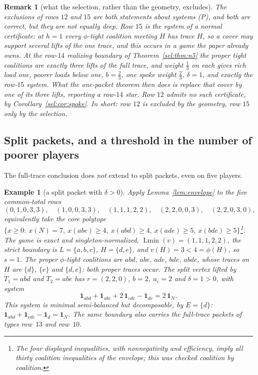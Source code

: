 \documentclass[11pt]{article}
\newtheorem{remark}[theorem]{Remark}
\newtheorem{example}[theorem]{Example}
\newcommand{\Lmin}{\operatorname{Lmin}}
\newcommand{\one}{\mathbf 1}
\begin{document}
\begin{remark}[what the selection, rather than the geometry, excludes]
\label{sel:rem:mixture}
The exclusions of rows $12$ and $15$ are both statements about systems (P), and
both are correct, but they are not equally deep.  Row $15$ \emph{is} the system
of a normal certificate: at $h=1$ every $\phi$-tight coalition meeting $H$
has trace $H$, so a cover may support several lifts of the one trace, and
this occurs in a game the paper already owns.  At the row-$14$ realizing
boundary of Theorem~\ref{sel:thm:n5} the proper tight coalitions are
exactly three lifts of the full trace, and weight $\tfrac13$ on each gives
rich load one, poorer loads below one, $b=\tfrac23$, one spoke weight
$\tfrac23$, $\delta=1$, and exactly the row-$15$ system.  What the
one-packet theorem then does is replace that cover by one of its three
lifts, reporting a row-$14$ star.  Row $12$ admits no such certificate, by
Corollary~\ref{sel:cor:spoke}.  In short: row $12$ is excluded by the geometry,
row $15$ only by the selection.
\end{remark}

\subsection{Split packets, and a threshold in the number of poorer players}

The full-trace conclusion does \emph{not} extend to split packets, even on five
players.

\begin{example}[a split packet with $\delta>0$]\label{sel:ex:split}
Apply Lemma~\ref{lem:envelope} to the five common-total rows
\[
 (0,1,0,3,3),\quad(1,0,0,3,3),\quad(1,1,1,2,2),\quad
 (2,2,0,0,3),\quad(2,2,0,3,0),
\]
equivalently take the core polytope
$\{x\ge0:\ x(N)=7,\ x(abe)\ge4,\ x(abd)\ge4,\ x(ade)\ge5,\
x(bde)\ge5\}$\footnote{The four displayed inequalities, with
nonnegativity and efficiency, imply all thirty coalition inequalities of the
envelope; this was checked coalition by coalition.}.
The game is exact and singleton-normalized, $\Lmin(v)=(1,1,1,2,2)$, the strict
boundary is $L=\{a,b,c\}$, $H=\{d,e\}$, and $v(H)=3<4=\phi(H)$, so $s=1$.  The
proper $\phi$-tight coalitions are $abd$, $abe$, $ade$, $bde$, $abde$, whose
traces on $H$ are $\{d\}$, $\{e\}$ and $\{d,e\}$: \emph{both} proper traces
occur.  The split vertex lifted by $T_1=abd$ and $T_2=abe$ has
$r=(2,2,0)$, $b=2$, $u_c=2$ and $\delta=1>0$, with system
\[
 \one_{abd}+\one_{abe}+2\,\one_{cde}-\one_{de}=2\,\one_N .
\]
This system is minimal semi-balanced but decomposable, by $E=\{d\}$:
$\one_{abd}+\one_{cde}-\one_d=\one_N$.  The same boundary also carries the
full-trace packets of types row~$13$ and row~$10$.
\end{example}
\end{document}
